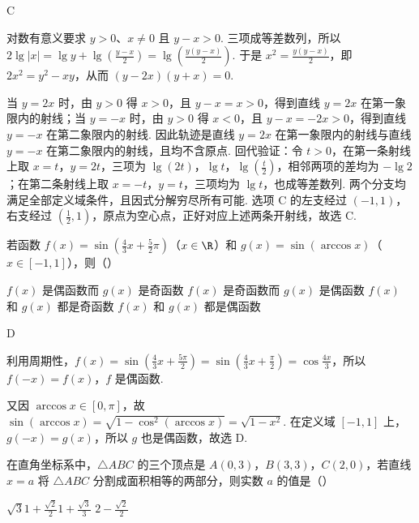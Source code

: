 \documentclass[UTF8,a4paper,oneside,11pt]{ctexbook}
\begin{document}
\begin{answer}
C
\end{answer}

\begin{solution}
对数有意义要求 \(y>0\)、\(x\neq0\) 且 \(y-x>0\). 三项成等差数列，所以
\(2\lg|x|=\lg y+\lg\left(\frac{y-x}{2}\right)=\lg\left(\frac{y(y-x)}{2}\right)\). 于是
\(x^{2}=\frac{y(y-x)}{2}\)，即
\(2x^{2}=y^{2}-xy\)，从而
\((y-2x)(y+x)=0\).

当 \(y=2x\) 时，由 \(y>0\) 得 \(x>0\)，且 \(y-x=x>0\)，得到直线 \(y=2x\) 在第一象限内的射线；当 \(y=-x\) 时，由 \(y>0\) 得 \(x<0\)，且 \(y-x=-2x>0\)，得到直线 \(y=-x\) 在第二象限内的射线. 因此轨迹是直线 \(y=2x\) 在第一象限内的射线与直线 \(y=-x\) 在第二象限内的射线，且均不含原点. 回代验证：令 \(t>0\)，在第一条射线上取 \(x=t\)，\(y=2t\)，三项为 \(\lg\left(2t\right)\)，\(\lg t\)，\(\lg\left(\frac{t}{2}\right)\)，相邻两项的差均为 \(-\lg2\)；在第二条射线上取 \(x=-t\)，\(y=t\)，三项均为 \(\lg t\)，也成等差数列. 两个分支均满足全部定义域条件，且因式分解穷尽所有可能. 选项 C 的左支经过 \(\left(-1,1\right)\)，右支经过 \(\left(\frac12,1\right)\)，原点为空心点，正好对应上述两条开射线，故选 C.
\end{solution}

\begin{problem}

若函数 \(f(x)=\sin\left(\frac{4}{3}x+\frac{5}{2}\pi\right) \)（\(x\in\R\)）和 \(g(x)=\sin(\arccos x) \)（\(x\in[-1,1]\)），则（\quad）

\choices
{\(f(x) \) 是偶函数而 \(g(x) \) 是奇函数}
{\(f(x) \) 是奇函数而 \(g(x) \) 是偶函数}
{\(f(x) \) 和 \(g(x) \) 都是奇函数}
{\(f(x) \) 和 \(g(x) \) 都是偶函数}
\end{problem}

\begin{answer}
D
\end{answer}

\begin{solution}
利用周期性，\(f(x)=\sin\left(\frac{4}{3}x+\frac{5\pi}{2}\right)=\sin\left(\frac{4}{3}x+\frac{\pi}{2}\right)=\cos\frac{4x}{3}\)，所以 \(f(-x)=f(x)\)，\(f\) 是偶函数.

又因 \(\arccos x\in[0,\pi]\)，故 \(\sin(\arccos x)=\sqrt{1-\cos^{2}(\arccos x)}=\sqrt{1-x^{2}}\). 在定义域 \([-1,1]\) 上，\(g(-x)=g(x)\)，所以 \(g\) 也是偶函数，故选 D.
\end{solution}

\begin{problem}

在直角坐标系中，\(\triangle ABC\) 的三个顶点是 \(A(0,3)\)，\(B(3,3)\)，\(C(2,0)\)，若直线 \(x=a\) 将 \(\triangle ABC\) 分割成面积相等的两部分，则实数 \(a\) 的值是（\quad）

\choices
{\(\sqrt{3} \)}{\(1+\frac{\sqrt{2}}{2} \)}{\(1+\frac{\sqrt{3}}
{3} \)}
{\(2-\frac{\sqrt{2}}
{2} \)}
\end{problem}
\end{document}
